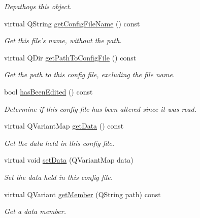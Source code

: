 \begin{DoxyCompactItemize}
\begin{DoxyCompactList}\small\item\em Depathoys this object. \end{DoxyCompactList}\item 
virtual Q\-String \hyperlink{class_a_w_e_1_1_config_file_aa93081a7067a27c880c0484f788081d1}{get\-Config\-File\-Name} () const 
\begin{DoxyCompactList}\small\item\em Get this file's name, without the path. \end{DoxyCompactList}\item 
virtual Q\-Dir \hyperlink{class_a_w_e_1_1_config_file_aab273e3e7a9d26985938ee02e921905a}{get\-Path\-To\-Config\-File} () const 
\begin{DoxyCompactList}\small\item\em Get the path to this config file, excluding the file name. \end{DoxyCompactList}\item 
bool \hyperlink{class_a_w_e_1_1_config_file_a4c588cb21802c958b2022b1083b1cfaa}{has\-Been\-Edited} () const 
\begin{DoxyCompactList}\small\item\em Determine if this config file has been altered since it was read. \end{DoxyCompactList}\item 
virtual Q\-Variant\-Map \hyperlink{class_a_w_e_1_1_config_file_a2cf12f94ae2dfc362ca39aadf49acddb}{get\-Data} () const 
\begin{DoxyCompactList}\small\item\em Get the data held in this config file. \end{DoxyCompactList}\item 
virtual void \hyperlink{class_a_w_e_1_1_config_file_a1c3e8e021ca4a065937dcd2218fb5b73}{set\-Data} (Q\-Variant\-Map data)
\begin{DoxyCompactList}\small\item\em Set the data held in this config file. \end{DoxyCompactList}\item 
virtual Q\-Variant \hyperlink{class_a_w_e_1_1_config_file_a8eebe0b7af8ca61e695dc2c9169caadd}{get\-Member} (Q\-String path) const 
\begin{DoxyCompactList}\small\item\em Get a data member. \end{DoxyCompactList}\item 

\end{DoxyCompactItemize}
